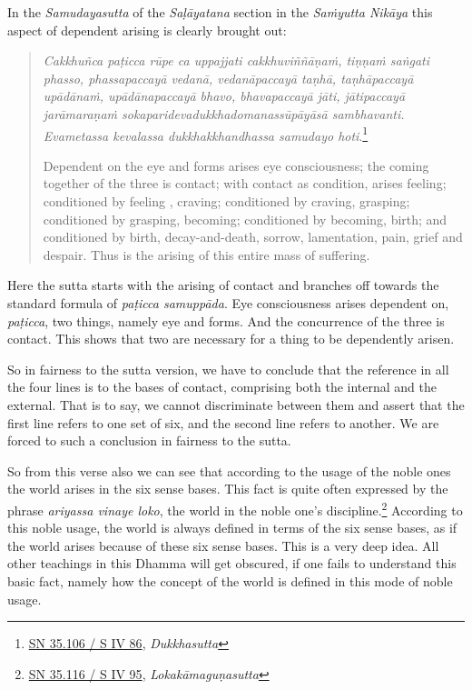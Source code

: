 In the \emph{Samudayasutta} of the \emph{Saḷāyatana} section in the \emph{Saṁyutta Nikāya} this aspect of dependent arising is clearly brought out:

\begin{quote}
\emph{Cakkhuñca paṭicca rūpe ca uppajjati cakkhuviññāṇaṁ, tiṇṇaṁ saṅgati phasso, phassapaccayā vedanā, vedanāpaccayā taṇhā, taṇhāpaccayā upādānaṁ, upādānapaccayā bhavo, bhavapaccayā jāti, jātipaccayā jarāmaraṇaṁ sokaparidevadukkhadomanassūpāyāsā sambhavanti. Evametassa kevalassa dukkhakkhandhassa samudayo hoti}.\footnote{\href{https://suttacentral.net/sn35.106/pli/ms}{SN 35.106 / S IV 86}, \emph{Dukkhasutta}}

Dependent on the eye and forms arises eye consciousness; the coming together of the three is contact; with contact as condition, arises feeling; conditioned by feeling , craving; conditioned by craving, grasping; conditioned by grasping, becoming; conditioned by becoming, birth; and conditioned by birth, decay-and-death, sorrow, lamentation, pain, grief and despair. Thus is the arising of this entire mass of suffering.
\end{quote}

Here the sutta starts with the arising of contact and branches off towards the standard formula of \emph{paṭicca samuppāda}. Eye consciousness arises dependent on, \emph{paṭicca}, two things, namely eye and forms. And the concurrence of the three is contact. This shows that two are necessary for a thing to be dependently arisen.

So in fairness to the sutta version, we have to conclude that the reference in all the four lines is to the bases of contact, comprising both the internal and the external. That is to say, we cannot discriminate between them and assert that the first line refers to one set of six, and the second line refers to another. We are forced to such a conclusion in fairness to the sutta.

So from this verse also we can see that according to the usage of the noble ones the world arises in the six sense bases. This fact is quite often expressed by the phrase \emph{ariyassa vinaye loko}, the world in the noble one's discipline.\footnote{\href{https://suttacentral.net/sn35.116/pli/ms}{SN 35.116 / S IV 95}, \emph{Lokakāmaguṇasutta}} According to this noble usage, the world is always defined in terms of the six sense bases, as if the world arises because of these six sense bases. This is a very deep idea. All other teachings in this Dhamma will get obscured, if one fails to understand this basic fact, namely how the concept of the world is defined in this mode of noble usage.

